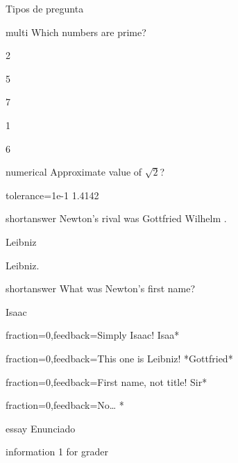 \documentclass[a4,11pt]{aleph-notas}
\begin{document}
\begin{quiz}{Tipos de pregunta}

\begin{multi}[]%
    {multi}
    Which numbers are prime? 
    \item* 2 
    \item* 5 
    \item* 7 
    \item 1 
    \item 6 
\end{multi}



\begin{numerical}[tolerance=0.01]%
    {numerical} 
    Approximate value of $\sqrt{2}$? 
    \item[tolerance={1e-1}] 1.4142
\end{numerical}


\begin{shortanswer}%
    {shortanswer}
    Newton's rival was Gottfried Wilhelm \blank. 
    \item Leibniz 
    \item Leibniz. 
\end{shortanswer}

\begin{shortanswer}[usecase]%
    {shortanswer}
    What was Newton's first name? 
    \item Isaac 
    \item[fraction=0,feedback={Simply Isaac!}] Isaa* 
    \item[fraction=0,feedback={This one is Leibniz!}] *Gottfried* 
    \item[fraction=0,feedback={First name, not title!}] Sir* 
    \item[fraction=0,feedback={No\dots}] * 
\end{shortanswer}

\begin{essay}[]%
    {essay} 
    Enunciado
    \item information 1 for grader 
\end{essay}


\end{quiz}
\end{document}
